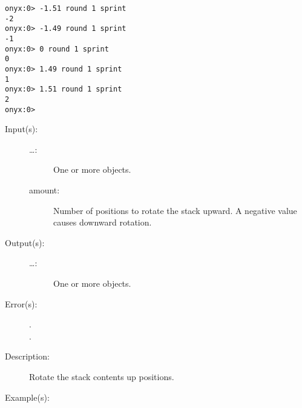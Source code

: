 \begin{description}
\begin{description}
\begin{verbatim}
onyx:0> -1.51 round 1 sprint
-2
onyx:0> -1.49 round 1 sprint
-1
onyx:0> 0 round 1 sprint
0
onyx:0> 1.49 round 1 sprint
1
onyx:0> 1.51 round 1 sprint
2
onyx:0>
		\end{verbatim}
	\end{description}
\label{systemdict:rot}
\item[{\onyxop{\dots amount}{rot}{\dots}}: ]
	\begin{description}\item[]
	\item[Input(s): ]
		\begin{description}\item[]
		\item[\dots: ]
			One or more objects.
		\item[amount: ]
			Number of positions to rotate the stack upward.  A
			negative value causes downward rotation.
		\end{description}
	\item[Output(s): ]
		\begin{description}\item[]
		\item[\dots: ]
			One or more objects.
		\end{description}
	\item[Error(s): ]
		\begin{description}\item[]
		\item[.]
		\item[.]
		\end{description}
	\item[Description: ]
		Rotate the stack contents up  positions.
	\item[Example(s): ]\begin{verbatim}


\end{verbatim}
\end{description}
\end{description}
